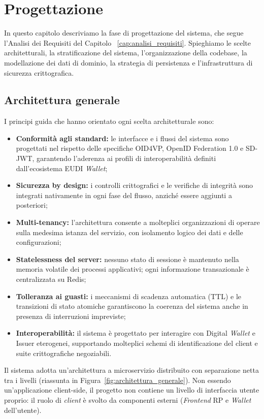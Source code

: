 \chapter{Progettazione}
\label{cap:progettazione}
In questo capitolo descriviamo la fase di progettazione del sistema, che segue l’Analisi dei Requisiti del Capitolo ~\ref{cap:analisi_requisiti}. Spieghiamo le scelte architetturali, la stratificazione del sistema, l’organizzazione della codebase, la modellazione dei dati di dominio, la strategia di persistenza e l’infrastruttura di sicurezza crittografica.

\section{Architettura generale}
I principi guida che hanno orientato ogni scelta architetturale sono:
\begin{itemize}
    \item \textbf{Conformità agli standard:} le interfacce e i flussi del sistema sono progettati nel rispetto delle specifiche OID4VP, OpenID Federation 1.0 e SD-JWT, garantendo l'aderenza ai profili di interoperabilità definiti dall'ecosistema EUDI \textit{Wallet};
    \item \textbf{Sicurezza by design:} i controlli crittografici e le verifiche di integrità sono integrati nativamente in ogni fase del flusso, anziché essere aggiunti a posteriori;
    \item \textbf{Multi-tenancy\glsfirstoccur{}:} l'architettura consente a molteplici organizzazioni di operare sulla medesima istanza del servizio, con isolamento logico dei dati e delle configurazioni;
    \item \textbf{Statelessness del server:} nessuno stato di sessione è mantenuto nella memoria volatile dei processi applicativi; ogni informazione transazionale è centralizzata su Redis;
    \item \textbf{Tolleranza ai guasti:} i meccanismi di scadenza automatica (TTL) e le transizioni di stato atomiche garantiscono la coerenza del sistema anche in presenza di interruzioni impreviste;
    \item \textbf{Interoperabilità:} il sistema è progettato per interagire con Digital \textit{Wallet}\glsfirstoccur{} e Issuer eterogenei, supportando molteplici schemi di identificazione del client e suite crittografiche negoziabili.
\end{itemize}
Il sistema adotta un'architettura a microservizio distribuito con separazione netta tra i livelli (riassunta in Figura~\ref{fig:architettura_generale}). Non essendo un'applicazione client-side, il progetto non contiene un livello di interfaccia utente proprio: il ruolo di \emph{client} è svolto da componenti esterni (\textit{Frontend} RP e \textit{Wallet} dell'utente).


